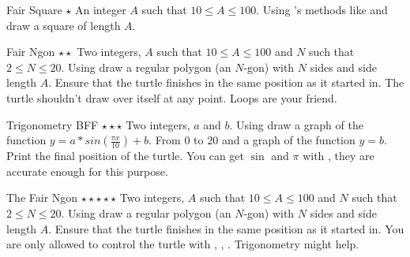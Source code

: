 
\begin{task}{Fair Square $\star$}
\In
An integer $A$ such that $10 \leq A \leq 100$.
\Out
Using 's methods like 
 and  draw a square of length $A$.
\end{task}

\begin{task}{Fair Ngon $\star\star$}
\In
Two integers, $A$ such that $10 \leq A \leq 100$ and $N$
such that $2 \leq N \leq 20$.
\Out
Using  draw a regular polygon (an $N$-gon) with $N$ sides and side
length $A$. Ensure that the turtle finishes in the same position as it started
in. The turtle shouldn't draw over itself at any point.
\Hint
Loops are your friend.
\end{task}

\begin{task}{Trigonometry BFF $\star\star\star$}
\In
Two integers, $a$ and $b$.
\Out
Using  draw a graph of the function $y = a * sin(\frac{\pi x}{10}) + b$.
From $0$ to $20$ and a graph of the function $y = b$. Print the final position
of the turtle.
\Hint
You can get $\sin$ and $\pi$ with , they are accurate
enough for this purpose.
\end{task}

\begin{task}{The Fair Ngon $\star\star\star\star\star$}
\In
Two integers, $A$ such that $10 \leq A \leq 100$ and $N$
such that $2 \leq N \leq 20$.
\Out
Using  draw a regular polygon (an $N$-gon) with $N$ sides and side
length $A$. Ensure that the turtle finishes in the same position as it started
in. You are only allowed to control the turtle with , ,
.
\Hint
Trigonometry might help.
\end{task}
